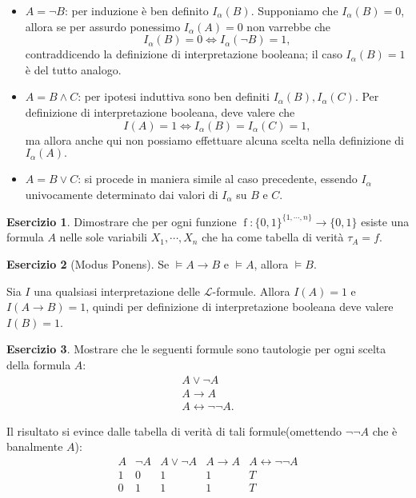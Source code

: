 \documentclass[a4paper]{article}
\newcommand{\limplies}{\rightarrow}
\newcommand{\liff}{\leftrightarrow}
\theoremstyle{definition}
\theoremstyle{definition}
\theoremstyle{remark}
\theoremstyle{definition}
\newtheorem{exercise}{Esercizio}[section]
\begin{document}
\begin{itemize}
	\item \(A=\lnot B\): per induzione è ben definito $I_{\alpha}\left( B \right).$ Supponiamo che \(I_{\alpha}\left( B \right)=0\), allora se per assurdo ponessimo \(I_{\alpha}\left( A \right)=0\) non
		varrebbe che \[ I_{\alpha}\left( B \right) = 0 \iff I_{\alpha}\left( \lnot B \right) = 1,\] contraddicendo la definizione di interpretazione booleana; il caso
		\(I_{\alpha}\left( B \right) = 1\) è del tutto analogo.
	\item \(A=B\land C\): per ipotesi induttiva sono ben definiti $I_{\alpha}\left( B \right), I_{\alpha}\left( C \right) $. Per definizione di interpretazione booleana, deve
		valere che $$ I\left( A \right) =1 \iff I_{\alpha}\left( B \right) =I_{\alpha}\left( C \right)=1  ,$$
		ma allora anche qui non possiamo effettuare alcuna scelta nella definizione di $I_{\alpha}\left( A \right) .$
	\item \(A=B\lor C\): si procede in maniera simile al caso precedente, essendo $I_{\alpha}$ univocamente determinato dai valori di $I_{\alpha}$ su $B$ e $C$.
\end{itemize}
\setcounter{exercise}{11}
\begin{exercise}
	Dimostrare che per ogni funzione $\operatorname{f}: \{0, 1\}^{\{1,\cdots,n\}} \to \{0, 1\}$ esiste una formula $A$ nelle sole variabili $X_1, \cdots ,
	X_n$ che ha come tabella di verità $\tau_A=f$.
\end{exercise}
\setcounter{exercise}{13}
\begin{exercise}[Modus Ponens]
	Se $\models A\limplies B$ e $\models A$, allora $\models B$.
\end{exercise}
Sia $I$ una qualsiasi interpretazione delle $\mathcal{L}$-formule. Allora $I(A)=1$ e $I(A\limplies B)=1$, quindi per definizione di interpretazione booleana deve valere $I(B)=1$.
\begin{exercise}
Mostrare che le seguenti formule sono tautologie per ogni scelta della formula $A$:
\begin{align*}
	A\lor\lnot A\\
	A\limplies A\\
	A\liff \lnot\lnot A
.\end{align*}
\end{exercise}
Il risultato si evince dalle tabella di verità di tali formule(omettendo $\lnot\lnot A$ che è banalmente $A$):
\begin{displaymath}
\begin{array}{c|cccc}
A & \lnot A & A\lor\lnot A & A\limplies A & A\liff \lnot\lnot A\\
\hline
1 & 0 & 1 & 1 & T\\
0 & 1 & 1 & 1 & T\\
\end{array}
\end{displaymath}
\end{document}
